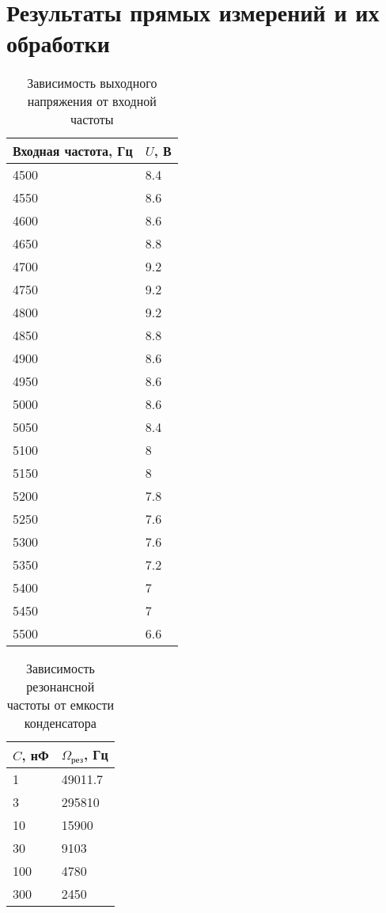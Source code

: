\section{Результаты прямых измерений и их обработки}
\begin{table}[H]
\centering
\begin{tabular}{|l|l|}
\hline
Входная частота, Гц & $U$, В \\
\hline
4500 & 8.4 \\
\hline
4550 & 8.6 \\
\hline
4600 & 8.6 \\
\hline
4650 & 8.8 \\
\hline
4700 & 9.2 \\
\hline
4750 & 9.2 \\
\hline
4800 & 9.2 \\
\hline
4850 & 8.8 \\
\hline
4900 & 8.6 \\
\hline
4950 & 8.6 \\
\hline
5000 & 8.6 \\
\hline
5050 & 8.4 \\
\hline
5100 & 8 \\
\hline
5150 & 8 \\
\hline
5200 & 7.8 \\
\hline
5250 & 7.6 \\
\hline
5300 & 7.6 \\
\hline
5350 & 7.2 \\
\hline
5400 & 7 \\
\hline
5450 & 7 \\
\hline
5500 & 6.6 \\
\hline
\end{tabular}
\caption{Зависимость выходного напряжения от входной частоты}
\end{table}

\begin{table}[H]
\centering
\begin{tabular}{|l|l|}
\hline
\(C\), нФ & \(\Omega_\text{рез}\), Гц \\
\hline
1		& 49011.7 \\
\hline
3		& 295810  \\
\hline
10	& 	15900 \\
\hline
30	& 	9103  \\
\hline
100	& 	4780  \\
\hline
300	& 	2450  \\
\hline
\end{tabular}
\caption{Зависимость резонансной частоты от емкости конденсатора}
\end{table}

